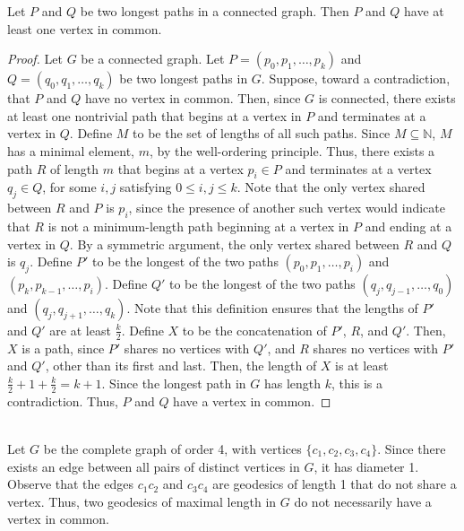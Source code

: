\documentclass[12pt]{article}
\begin{document}
\newpage
{}

 Let $P$ and $Q$ be two longest paths in a connected graph. Then $P$ and $Q$ have at least one vertex in common.
\begin{proof}
    Let $G$ be a connected graph.
    Let $P=(p_0, p_1,\hdots,p_k)$ and $Q=(q_0, q_1,\hdots, q_k)$ be two longest paths in $G$.
    Suppose, toward a contradiction, that $P$ and $Q$ have no vertex in common.
    Then, since $G$ is connected, there exists at least one nontrivial path that begins at a vertex in $P$ and terminates at a vertex in $Q$.
    Define $M$ to be the set of lengths of all such paths.
    Since $M \subseteq \mathbb N$, $M$ has a minimal element, $m$, by the well-ordering principle.
    Thus, there exists a path $R$ of length $m$ that begins at a vertex $p_i \in P$ and terminates at a vertex $q_j \in Q$, for some $i,j$ satisfying $0 \leq i,j \leq k$.
    Note that the only vertex shared between $R$ and $P$ is $p_i$, since the presence of another such vertex would indicate that $R$ is not a minimum-length path beginning at a vertex in $P$ and ending at a vertex in $Q$.
    By a symmetric argument, the only vertex shared between $R$ and $Q$ is $q_j$.
    Define $P'$ to be the longest of the two paths $(p_0, p_1, \hdots, p_i)$ and $(p_k, p_{k-1}, \hdots, p_i)$. %
    Define $Q'$ to be the longest of the two paths $(q_j, q_{j-1}, \hdots, q_0)$ and $(q_j, q_{j+1}, \hdots, q_k)$.
    Note that this definition ensures that the lengths of $P'$ and $Q'$ are at least $\frac k2$.
    Define $X$ to be the concatenation of $P'$, $R$, and $Q'$.
   Then, $X$ is a path, since $P'$ shares no vertices with $Q'$, and $R$ shares no vertices with $P'$ and $Q'$, other than its first and last.
    Then, the length of $X$ is at least $\frac k2 + 1 + \frac k2 = k + 1$.
    Since the longest path in $G$ has length $k$, this is a contradiction.
    Thus, $P$ and $Q$ have a vertex in common.
\end{proof}
\medskip
{}\\
    Let $G$ be the complete graph of order 4, with vertices $\{c_1, c_2, c_3, c_4\}$.
    Since there exists an edge between all pairs of distinct vertices in $G$, it has diameter 1.
    Observe that the edges $c_1c_2$ and $c_3c_4$ are geodesics of length 1 that do not share a vertex.
    Thus, two geodesics of maximal length in $G$ do not necessarily have a vertex in common.
\end{document}

